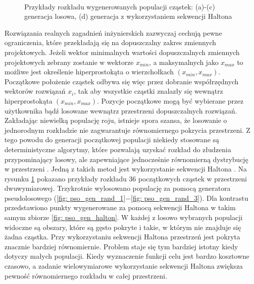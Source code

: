 \begin{figure}[h]
	\centering
	\\
	\captionsetup{justification=centering}
	\caption{Przykłady rozkładu wygenerowanych populacji cząstek: (a)-(c) generacja losowa, (d) generacja z wykorzystaniem sekwencji Haltona}
	\label{fig: pso_gen_expl}
\end{figure}
Rozwiązania realnych zagadnień inżynierskich zazwyczaj cechują pewne ograniczenia, które przekładają się na dopuszczalny zakres zmiennych projektowych. Jeżeli wektor minimalnych wartości dopuszczalnych zmiennych projektowych zebrany zostanie w wektorze $x_{min}$, a maksymalnych jako $x_{max}$ to możliwe jest określenie hiperprostokąta o wierzchołkach $(x_{min},x_{max})$. Początkowe położenie cząstek odbywa się więc przez dobranie współrzędnych wektorów rozwiązań $x_i$, tak aby wszystkie cząstki znalazły się wewnątrz hiperprostokąta $(x_{min},x_{max})$. Pozycje początkowe mogą być wybierane przez użytkownika bądź losowane wewnątrz przestrzeni dopuszczalnych rozwiązań. Zakładając niewielką populację roju, istnieje spora szansa, że losowanie o jednorodnym rozkładzie nie zagwarantuje równomiernego pokrycia przestrzeni. Z tego powodu do generacji początkowej populacji niekiedy stosowane są deterministyczne algorytmy, które pozwalają uzyskać rozkład do złudzenia przypominający losowy, ale zapewniające jednocześnie równomierną dystrybucję w przestrzeni \parencite{Saliby2002}. Jedną z takich metod jest wykorzystanie sekwencji Haltona \parencite{Tesch2016}. Na rysunku \ref{fig: pso_gen_expl} pokazano przykłady rozkładu 36 początkowych cząstek w przestrzeni dwuwymiarowej. Trzykrotnie wylosowano populację za pomocą generatora pseudolosowego (\ref{fig: pso_gen_rand_1}$-$\ref{fig: pso_gen_rand_3}). Dla kontrastu przedstawiono punkty wygenerowane za pomocą sekwencji Haltona w takim samym zbiorze \ref{fig: pso_gen_halton}. W każdej z losowo wybranych populacji widoczne są obszary, które są gęsto pokryte i takie, w którym nie znajduje się żadna cząstka. Przy wykorzystaniu sekwencji Haltona przestrzeń jest pokryta znacznie bardziej równomiernie. Problem staje się tym bardziej istotny kiedy dotyczy małych populacji. Kiedy wyznaczenie funkcji celu jest bardzo kosztowne czasowo, a zadanie wielowymiarowe wykorzystanie sekwencji Haltona zwiększa pewność równomiernego rozkładu w całej przestrzeni.

